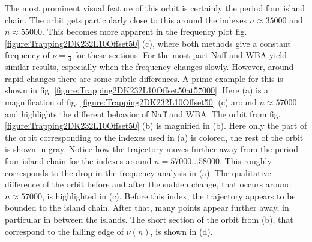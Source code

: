 The most prominent visual feature of this orbit is certainly the period four island chain. 
The orbit gets particularly close to this around the indexes $n\approx 35000$ and $n\approx 55000$. 
This becomes more apparent in the frequency plot fig. \ref{figure:Trapping2DK232L10Offset50} (c), where both methods give a constant frequency of $\nu =\frac{1}{4}$ for these sections.
For the most part Naff and WBA yield similar results, especially when the frequency changes slowly. 
However, around rapid changes there are some subtle differences. 
A prime example for this is shown in fig. \ref{figure:Trapping2DK232L10Offset50at57000}.
Here (a) is a magnification of fig. \ref{figure:Trapping2DK232L10Offset50} (c) around $n\approx 57000$ and highlights the different behavior of Naff and WBA.
The orbit from fig. \ref{figure:Trapping2DK232L10Offset50} (b) is magnified in (b).
Here only the part of the orbit corresponding to the indexes used in (a) is colored, the rest of the orbit is shown in gray. 
Notice how the trajectory moves further away from the period four island chain for the indexes around $n=57000\dots 58000$. 
This roughly corresponds to the drop in the frequency analysis in (a).
The qualitative difference of the orbit before and after the sudden change, that occurs around $n\approx 57000$, is highlighted in (c). 
Before this index, the trajectory appears to be bounded to the island chain. 
After that, many points appear further away, in particular in between the islands.
The short section of the orbit from (b), that correspond to the falling edge of $\nu(n)$, is shown in (d).
